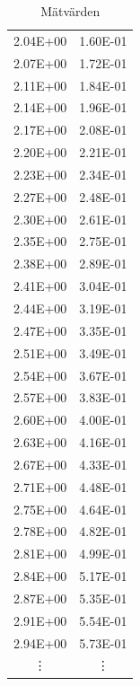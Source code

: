 \documentclass[11p, titlepage, oneside, a4paper]{article}
\begin{document}
\begin{table}
\begin{center}
\begin{tabular}{ |c|c| }
                2.04E+00 & 1.60E-01 \\
                2.07E+00 & 1.72E-01 \\
                2.11E+00 & 1.84E-01 \\
                2.14E+00 & 1.96E-01 \\
                2.17E+00 & 2.08E-01 \\
                2.20E+00 & 2.21E-01 \\
                2.23E+00 & 2.34E-01 \\
                2.27E+00 & 2.48E-01 \\
                2.30E+00 & 2.61E-01 \\
                2.35E+00 & 2.75E-01 \\
                2.38E+00 & 2.89E-01 \\
                2.41E+00 & 3.04E-01 \\
                2.44E+00 & 3.19E-01 \\
                2.47E+00 & 3.35E-01 \\
                2.51E+00 & 3.49E-01 \\
                2.54E+00 & 3.67E-01 \\
                2.57E+00 & 3.83E-01 \\
                2.60E+00 & 4.00E-01 \\
                2.63E+00 & 4.16E-01 \\
                2.67E+00 & 4.33E-01 \\
                2.71E+00 & 4.48E-01 \\
                2.75E+00 & 4.64E-01 \\
                2.78E+00 & 4.82E-01 \\
                2.81E+00 & 4.99E-01 \\
                2.84E+00 & 5.17E-01 \\
                2.87E+00 & 5.35E-01 \\
                2.91E+00 & 5.54E-01 \\
                2.94E+00 & 5.73E-01 \\
            \vdots & \vdots \\
            \hline
            \end{tabular}
            \caption{Mätvärden}
            \label{table:result}
            \end{center}
        \end{table}

    
    \printbibliography
\end{document}
